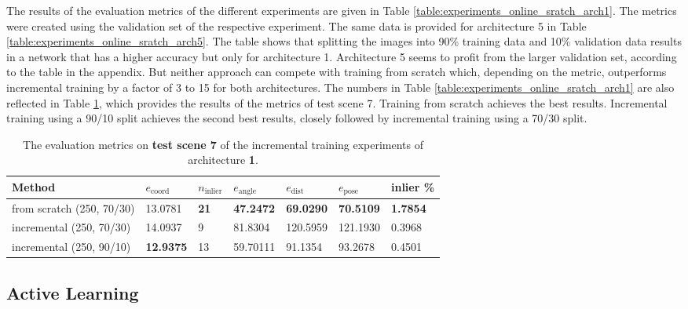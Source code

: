 The results of the evaluation metrics of the different experiments are given in Table \ref{table:experiments_online_sratch_arch1}. The metrics were created using the validation set of the respective experiment. The same data is provided for architecture 5 in Table \ref{table:experiments_online_sratch_arch5}. The table shows that splitting the images into 90\% training data and 10\% validation data results in a network that has a higher accuracy but only for architecture 1. Architecture 5 seems to profit from the larger validation set, according to the table in the appendix. But neither approach can compete with training from scratch which, depending on the metric, outperforms incremental training by a factor of 3 to 15 for both architectures. The numbers in Table \ref{table:experiments_online_sratch_arch1} are also reflected in Table \ref{table:experiments_online_scratch_arch1_test_set}, which provides the results of the metrics of test scene 7. Training from scratch achieves the best results. Incremental training using a 90/10 split achieves the second best results, closely followed by incremental training using a 70/30 split.

\begin{table}[]
\centering
\begin{tabular}{|l||llllll|} \hline 
Method   & $e_{\text{coord}}$ & $n_{\text{inlier}}$ & $e_{\text{angle}}$ & $e_{\text{dist}}$ & $e_{\text{pose}}$  & inlier \% \\ \hline \hline  \rowcolor{Gray}
from scratch (250, 70/30)       & 13.0781             & \textbf{21}                 & \textbf{47.2472}  &\textbf{69.0290}          & \textbf{70.5109}            & \textbf{1.7854}            \\ 
incremental (250, 70/30) & 14.0937             & 9                  & 81.8304             & 120.5959           & 121.1930 & 0.3968         \\  \rowcolor{Gray}
incremental (250, 90/10) & \textbf{12.9375}             & 13                 & 59.70111            & 91.1354            & 93.2678   & 0.4501      \\ \hline 
\end{tabular}
\caption{The evaluation metrics on \textbf{test scene 7} of the incremental training experiments of architecture \textbf{1}.}
\label{table:experiments_online_scratch_arch1_test_set}
\end{table}

\subsection{Active Learning} \label{subsection:experiments_active_learning}

